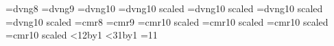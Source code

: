 % 
%
%
%
%
%
\font\smalldn=dvng8
\font\ninedn=dvng9
\font\dvng=dvng10
\font\halfdn=dvng10 scaled\magstephalf
\font\bigdn=dvng10 scaled
\font\largedn=dvng10 scaled
\font\hugedn=dvng10 scaled
\hyphenchar{}
\hyphenchar{}
\hyphenchar{}
\hyphenchar{}
\hyphenchar{}
\hyphenchar{}
\hyphenchar{}
\font\smallcr=cmr8
\font\ninecr=cmr9
\font\halfcr=cmr10 scaled\magstephalf
\font\bigcr=cmr10 scaled
\font\largecr=cmr10 scaled
\font\hugecr=cmr10 scaled
\let\rsize=\rm
\newcount\chnum
\newdimen\itdim
\newdimen\dnblskip
\newif\ifdnmode
{}
\loop\catcode{}
\ifnum\chnum<12\advance\chnum by1
\repeat
{}
\loop\catcode{}
\ifnum\chnum<31\advance\chnum by1
\repeat
{}=11
\def\subscr#1{\/\itdim=\lastkern
\unkern\kern-\itdim \lower\dp0 \hbox to\itdim{#1\hfil}}
\def\dnsmall{\let\pdn=\smalldn\let\rsize=\smallcr%
\dnblskip=12pt\ifdnmode\dn\fi}
\def\dnnine{\let\pdn=\ninedn\let\rsize=\ninecr%
\dnblskip=13pt\ifdnmode\dn\fi}
\def\dnnormal{\let\pdn=\dvng\let\rsize=\rm%
\dnblskip=15pt\ifdnmode\dn\fi}
\def\dnhalf{\let\pdn=\halfdn\let\rsize=\halfcr%
\dnblskip=16pt\ifdnmode\dn\fi}
\def\dnbig{\let\pdn=\bigdn\let\rsize=\bigcr%
\dnblskip=18pt\ifdnmode\dn\fi}
\def\dnlarge{\let\pdn=\largedn\let\rsize=\largecr%
\dnblskip=22pt\ifdnmode\dn\fi}
\def\dnhuge{\let\pdn=\hugedn\let\rsize=\hugecr%
\dnblskip=26pt\ifdnmode\dn\fi}
\def\dn{\dnmodetrue\pdn\baselineskip=\dnblskip
\tolerance=10000
\pretolerance=10000}
\def\0{\llap{\char13}}
\def\1{\llap{\char32}}
\def\2{\llap{\char92}}
\def\3#1w{{\char"#1}}
\def\4{\llap{\char123}}
\def\5{\llap{\char125}}
\def\6#1{\setbox0=\hbox{#1}#1\subscr{\char126}}
